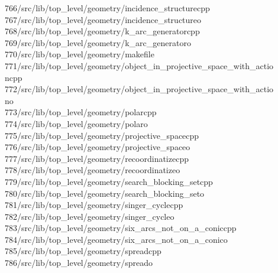 \begin{tabbing}
766\>/src/lib/top\_level/geometry/incidence\_structurecpp\\[0pt]
767\>/src/lib/top\_level/geometry/incidence\_structureo\\[0pt]
768\>/src/lib/top\_level/geometry/k\_arc\_generatorcpp\\[0pt]
769\>/src/lib/top\_level/geometry/k\_arc\_generatoro\\[0pt]
770\>/src/lib/top\_level/geometry/makefile\\[0pt]
771\>/src/lib/top\_level/geometry/object\_in\_projective\_space\_with\_actio\\[0pt]
\>ncpp\\[0pt]
772\>/src/lib/top\_level/geometry/object\_in\_projective\_space\_with\_actio\\[0pt]
\>no\\[0pt]
773\>/src/lib/top\_level/geometry/polarcpp\\[0pt]
774\>/src/lib/top\_level/geometry/polaro\\[0pt]
775\>/src/lib/top\_level/geometry/projective\_spacecpp\\[0pt]
776\>/src/lib/top\_level/geometry/projective\_spaceo\\[0pt]
777\>/src/lib/top\_level/geometry/recoordinatizecpp\\[0pt]
778\>/src/lib/top\_level/geometry/recoordinatizeo\\[0pt]
779\>/src/lib/top\_level/geometry/search\_blocking\_setcpp\\[0pt]
780\>/src/lib/top\_level/geometry/search\_blocking\_seto\\[0pt]
781\>/src/lib/top\_level/geometry/singer\_cyclecpp\\[0pt]
782\>/src/lib/top\_level/geometry/singer\_cycleo\\[0pt]
783\>/src/lib/top\_level/geometry/six\_arcs\_not\_on\_a\_coniccpp\\[0pt]
784\>/src/lib/top\_level/geometry/six\_arcs\_not\_on\_a\_conico\\[0pt]
785\>/src/lib/top\_level/geometry/spreadcpp\\[0pt]
786\>/src/lib/top\_level/geometry/spreado\\[0pt]

\end{tabbing}
